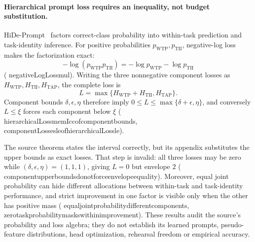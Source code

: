 \documentclass[11pt]{article}
\newcommand{\leanname}[1]{{\scriptsize\ttfamily
  \def\_{\textunderscore\allowbreak}#1}}
\begin{document}
\paragraph{Hierarchical prompt loss requires an inequality, not budget substitution.}
HiDe-Prompt~\cite{wang2023hideprompt} factors correct-class probability into
within-task prediction and task-identity inference.  For positive
probabilities $p_{\mathrm{WTP}},p_{\mathrm{TII}}$, negative-log loss makes the
factorization exact:
\[
 -\log(p_{\mathrm{WTP}}p_{\mathrm{TII}})
 =-\log p_{\mathrm{WTP}}-\log p_{\mathrm{TII}}
\]
(\leanname{negativeLogLoss\_mul}).  Writing the three nonnegative component
losses as $H_{\mathrm{WTP}},H_{\mathrm{TII}},H_{\mathrm{TAP}}$, the complete
loss is
\[
 L=\max\{H_{\mathrm{WTP}}+H_{\mathrm{TII}},H_{\mathrm{TAP}}\}.
\]
Component bounds $\delta,\epsilon,\eta$ therefore imply
$0\leq L\leq\max\{\delta+\epsilon,\eta\}$, and conversely $L\leq\xi$ forces
each component below $\xi$
(\leanname{hierarchicalLoss\_mem\_Icc\_of\_component\_bounds},
\leanname{componentLosses\_le\_of\_hierarchicalLoss\_le}).

The source theorem states the interval correctly, but its appendix substitutes
the upper bounds as exact losses.  That step is invalid: all three losses may
be zero while $(\delta,\epsilon,\eta)=(1,1,1)$, giving $L=0$ but envelope $2$
(\leanname{component\_upper\_bounds\_do\_not\_force\_envelope\_equality}).
Moreover, equal joint probability can hide different allocations between
within-task and task-identity performance, and strict improvement in one
factor is visible only when the other has positive mass
(\leanname{equal\_joint\_probability\_different\_components},
\leanname{zero\_task\_probability\_masks\_within\_improvement}).
These results audit the source's probability and loss algebra; they do not
establish its learned prompts, pseudo-feature distributions, head
optimization, rehearsal freedom or empirical accuracy.
\end{document}

